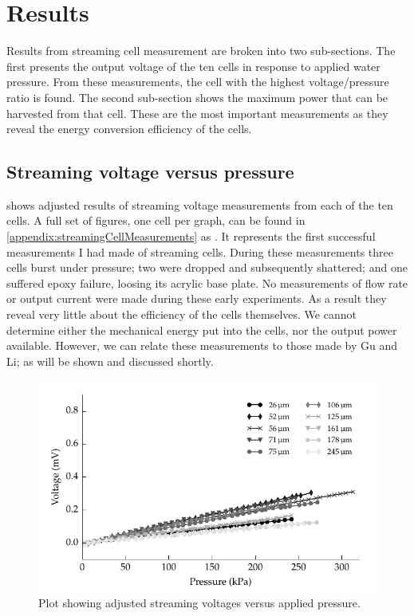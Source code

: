 \section{Results}
  \label{sect:part1_energyHarvesting_results}


  Results from streaming cell measurement are broken into two sub-sections.
  The first presents the output voltage of the ten cells in response to applied water pressure.
  From these measurements, the cell with the highest voltage/pressure ratio is found.
  The second sub-section shows the maximum power that can be harvested from that cell.
  These are the most important measurements as they reveal the energy conversion efficiency of the cells.


  \subsection{Streaming voltage versus pressure}



     shows adjusted results of streaming voltage measurements from each of the ten cells.
    A full set of figures, one cell per graph, can be found in \cref{appendix:streamingCellMeasurements} as .
    It represents the first successful measurements I had made of streaming cells.
    During these measurements three cells burst under pressure; two were dropped and subsequently shattered; and one suffered epoxy failure, loosing its acrylic base plate.
    No measurements of flow rate or output current were made during these early experiments.
    As a result they reveal very little about the efficiency of the cells themselves.
    We cannot determine either the mechanical energy put into the cells, nor the output power available.
    However, we can relate these measurements to those made by Gu and Li; as will be shown and discussed shortly.

    \begin{figure}
        \centering
        \includegraphics{content/pt1/01-PowerHarvesting/graphics/graph_streamingVoltageGradient_vs_height}
        \caption{\label{fig:streamingCell_all_adjusted}Plot showing adjusted streaming voltages versus applied pressure.}
    \end{figure}

